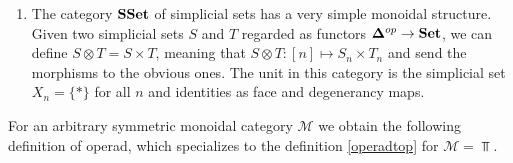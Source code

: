 \documentclass[TFM.tex]{subfiles}
\begin{document}
\begin{ex}
\begin{enumerate}
\item The category $\mathrm{\mathbf{SSet}}$ of simplicial sets has a very simple monoidal structure. Given two simplicial sets $S$ and $T$ regarded as functors $\mathbf{\Delta}^{op}\to\mathrm{\mathbf{Set}}$, we can define $S\otimes T=S\times T$, meaning that $S\otimes T:[n]\mapsto S_n\times T_n$ and send the morphisms to the obvious ones. The unit in this category is the simplicial set $X_n=\{*\}$ for all $n$ and identities as face and degenerancy maps. 
\end{enumerate}



\end{ex}



For an arbitrary symmetric monoidal category $\mathscr{M}$ we obtain the following definition of operad, which specializes to the definition \ref{operadtop} for $\mathscr{M}=\Top$.
\end{document}

